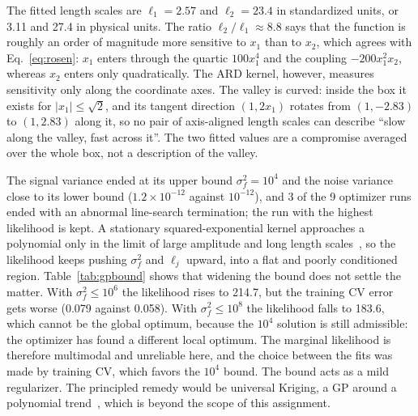 The fitted length scales are $\ell_1=2.57$ and $\ell_2=23.4$ in standardized units, or 3.11 and 27.4 in physical units. The ratio $\ell_2/\ell_1\approx8.8$ says that the function is roughly an order of magnitude more sensitive to $x_1$ than to $x_2$, which agrees with Eq.~\eqref{eq:rosen}: $x_1$ enters through the quartic $100x_1^4$ and the coupling $-200x_1^2x_2$, whereas $x_2$ enters only quadratically. The ARD kernel, however, measures sensitivity only along the coordinate axes. The valley is curved: inside the box it exists for $|x_1|\le\sqrt2$, and its tangent direction $(1,2x_1)$ rotates from $(1,-2.83)$ to $(1,2.83)$ along it, so no pair of axis-aligned length scales can describe ``slow along the valley, fast across it''. The two fitted values are a compromise averaged over the whole box, not a description of the valley.

The signal variance ended at its upper bound $\sigma_f^2=10^4$ and the noise variance close to its lower bound ($1.2\times10^{-12}$ against $10^{-12}$), and 3 of the 9 optimizer runs ended with an abnormal line-search termination; the run with the highest likelihood is kept. A stationary squared-exponential kernel approaches a polynomial only in the limit of large amplitude and long length scales~\cite{rasmussen2006}, so the likelihood keeps pushing $\sigma_f^2$ and $\ell_j$ upward, into a flat and poorly conditioned region. Table~\ref{tab:gpbound} shows that widening the bound does not settle the matter. With $\sigma_f^2\le10^6$ the likelihood rises to 214.7, but the training CV error gets worse (0.079 against 0.058). With $\sigma_f^2\le10^8$ the likelihood falls to 183.6, which cannot be the global optimum, because the $10^4$ solution is still admissible: the optimizer has found a different local optimum. The marginal likelihood is therefore multimodal and unreliable here, and the choice between the fits was made by training CV, which favors the $10^4$ bound. The bound acts as a mild regularizer. The principled remedy would be universal Kriging, a GP around a polynomial trend~\cite{forrester2008}, which is beyond the scope of this assignment.

